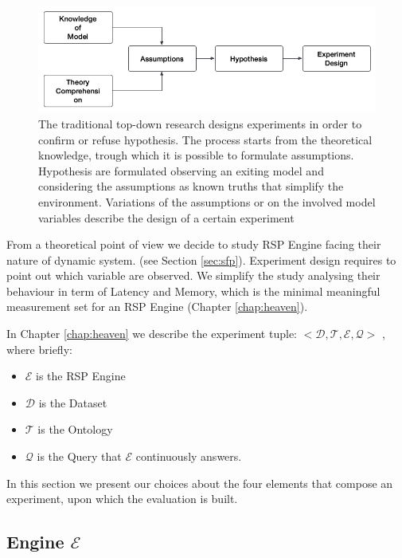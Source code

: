 \begin{figure}[tbh]
  \centering
	\includegraphics[width=\linewidth]{images/experiment-design}
	\caption[Experiment Design Process]{The traditional top-down research designs experiments in order to confirm or refuse hypothesis. The process starts from the theoretical knowledge, trough which it is possible to formulate assumptions. Hypothesis are formulated observing an exiting model and considering the assumptions as known truths that simplify the environment. Variations of the assumptions or on the involved model variables describe the design of a certain experiment}
  	\label{fig:experiment-design}
\end{figure}

From a theoretical point of view we decide to study RSP Engine facing their nature of dynamic system. (see Section \ref{sec:sfp}). Experiment design requires to point out which variable are observed. We simplify the study analysing their behaviour in term of Latency and Memory, which is the minimal meaningful measurement set for an RSP Engine (Chapter \ref{chap:heaven}).

In Chapter \ref{chap:heaven} we describe the experiment tuple: $<\mathcal{D}, \mathcal{T},\mathcal{E}, \mathcal{Q}>$ , where briefly:
\begin{itemize}
\item $\mathcal{E}$ is the RSP Engine
\item $\mathcal{D}$ is the Dataset 
\item $\mathcal{T}$ is the Ontology
\item $\mathcal{Q}$ is the Query that $\mathcal{E}$ continuously answers.
\end{itemize}

In this section we present our choices about the four elements that compose an experiment, upon which the evaluation is built.

\pagebreak

\subsection{Engine $\mathcal{E}$}

